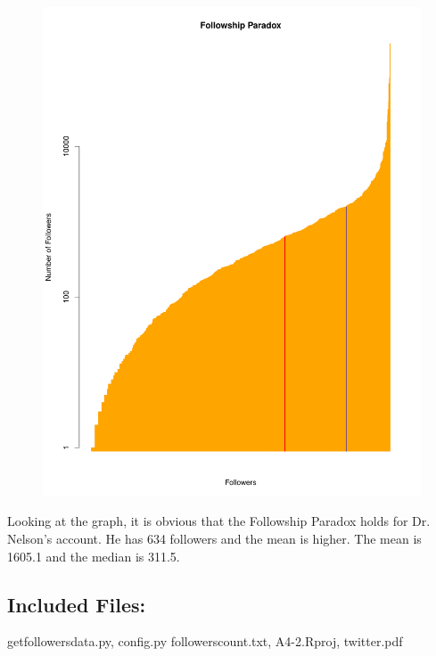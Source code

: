 \documentclass[a4paper, 11pt]{article}
\begin{document}
\begin{figure}[H]
\centering
\includegraphics[scale=0.7]{twitter.pdf}
\end{figure}

Looking at the graph, it is obvious that the Followship Paradox holds for Dr. Nelson’s account. He has 634 followers and the mean is higher. The mean is 1605.1 and the median is 311.5.


\subsection*{Included Files:}
getfollowersdata.py, config.py followerscount.txt, A4-2.Rproj, twitter.pdf
\end{document}
